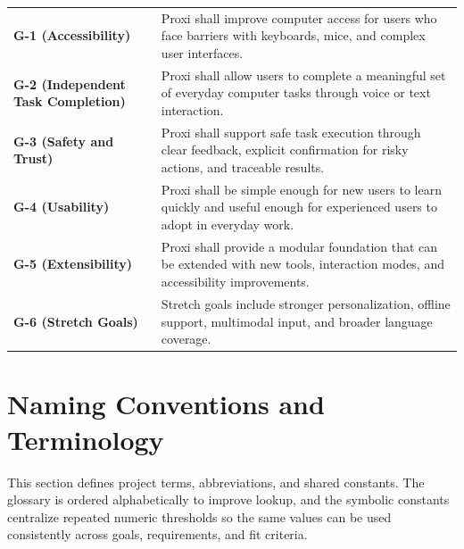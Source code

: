 \documentclass[12pt]{article}
\begin{document}
\begin{tabularx}{\textwidth}{p{4.1cm}X}
\textbf{G-1 (Accessibility)} & Proxi shall improve computer access for
users who face barriers with keyboards, mice, and complex user
interfaces. \\
\textbf{G-2 (Independent Task Completion)} & Proxi shall allow users to
complete a meaningful set of everyday computer tasks through voice or
text interaction. \\
\textbf{G-3 (Safety and Trust)} & Proxi shall support safe task
execution through clear feedback, explicit confirmation for risky
actions, and traceable results. \\
\textbf{G-4 (Usability)} & Proxi shall be simple enough for new users
to learn quickly and useful enough for experienced users to adopt in
everyday work. \\
\textbf{G-5 (Extensibility)} & Proxi shall provide a modular
foundation that can be extended with new tools, interaction modes, and
accessibility improvements. \\
\textbf{G-6 (Stretch Goals)} & Stretch goals include stronger
personalization, offline support, multimodal input, and broader
language coverage. \\
\end{tabularx}

\section{Naming Conventions and Terminology}
This section defines project terms, abbreviations, and shared
constants. The glossary is ordered alphabetically to improve lookup,
and the symbolic constants centralize repeated numeric thresholds so
the same values can be used consistently across goals, requirements,
and fit criteria.
\end{document}
